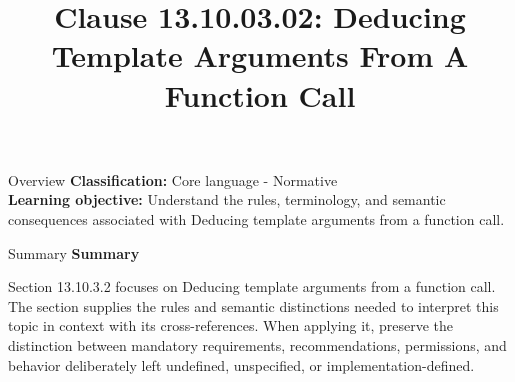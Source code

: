 \documentclass[10pt,letterpaper]{article}
\title{Clause 13.10.03.02: Deducing Template Arguments From A Function Call}
\author{}
\date{}
\begin{document}
\maketitle
\begin{CornellOverviewBox}{Overview}
\textbf{Classification:} Core language - Normative\\[2pt]
\textbf{Learning objective:} Understand the rules, terminology, and semantic consequences associated with Deducing template arguments from a function call.
\end{CornellOverviewBox}\begin{CornellSummaryBox}{Summary}
{\sffamily\bfseries\color{Accent} Summary}\par\vspace{3pt}Section 13.10.3.2 focuses on Deducing template arguments from a function call. The section supplies the rules and semantic distinctions needed to interpret this topic in context with its cross-references. When applying it, preserve the distinction between mandatory requirements, recommendations, permissions, and behavior deliberately left undefined, unspecified, or implementation-defined.
\end{CornellSummaryBox}
\end{document}
